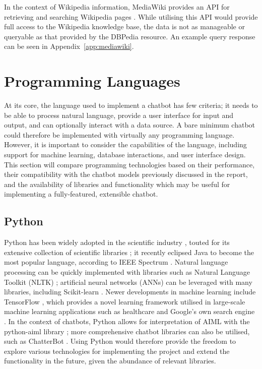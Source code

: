 In the context of Wikipedia information, MediaWiki provides an API for retrieving and searching Wikipedia pages \cite{mediawiki}. While utilising this API would provide full access to the Wikipedia knowledge base, the data is not as manageable or queryable as that provided by the DBPedia resource. An example query response can be seen in Appendix~\ref{app:mediawiki}.

\newpage
\section{Programming Languages}
\label{sec:langreview}
At its core, the language used to implement a chatbot has few criteria; it needs to be able to process natural language, provide a user interface for input and output, and can optionally interact with a data source. A bare minimum chatbot could therefore be implemented with virtually any programming language. However, it is important to consider the capabilities of the language, including support for machine learning, database interactions, and user interface design. This section will compare programming technologies based on their performance, their compatibility with the chatbot models previously discussed in the report, and the availability of libraries and functionality which may be useful for implementing a fully-featured, extensible chatbot.
 
\subsection{Python}
Python has been widely adopted in the scientific industry \cite{bird2009natural}, touted for its extensive collection of scientific libraries \cite{koepke2011python}; it recently eclipsed Java to become the most popular language, according to IEEE Spectrum \cite{cass2019}. Natural language processing can be quickly implemented with libraries such as Natural Language Toolkit (NLTK) \cite{nltk2019}; artificial neural networks (ANNs) can be leveraged with many libraries, including Scikit-learn \cite{pedregosa2011scikit}. Newer developments in machine learning include TensorFlow \cite{abadi2016tensorflow}, which provides a novel learning framework utilised in large-scale machine learning applications such as healthcare \cite{polzin2019} and Google’s own search engine \cite{pichai2015}. In the context of chatbots, Python allows for interpretation of AIML with the python-aiml library \cite{villegas2019}; more comprehensive chatbot libraries can also be utilised, such as ChatterBot \cite{cox2019}. Using Python would therefore provide the freedom to explore various technologies for implementing the project and extend the functionality in the future, given the abundance of relevant libraries.

